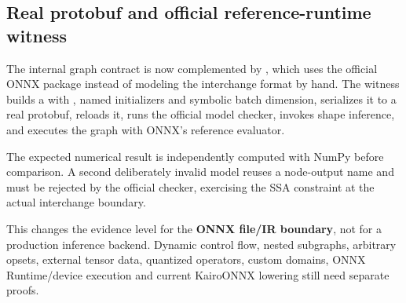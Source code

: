 \subsection{Real protobuf and official reference-runtime witness}\label{appendix-a87217e3af2b-real-protobuf-and-official-reference-runtime-witness}

\hypertarget{appendix-a87217e3af2b-real-protobuf-and-official-reference-runtime-witness}{}

The internal graph contract is now complemented by , which uses the official ONNX package instead of modeling the interchange format by hand. The witness builds a  with , named initializers and symbolic batch dimension, serializes it to a real  protobuf, reloads it, runs the official model checker, invokes shape inference, and executes the graph with ONNX's reference evaluator.

The expected numerical result is independently computed with NumPy before comparison. A second deliberately invalid model reuses a node-output name and must be rejected by the official checker, exercising the SSA constraint at the actual interchange boundary.

This changes the evidence level for the \textbf{ONNX file/IR boundary}, not for a production inference backend. Dynamic control flow, nested subgraphs, arbitrary opsets, external tensor data, quantized operators, custom domains, ONNX Runtime/device execution and current KairoONNX lowering still need separate proofs.
